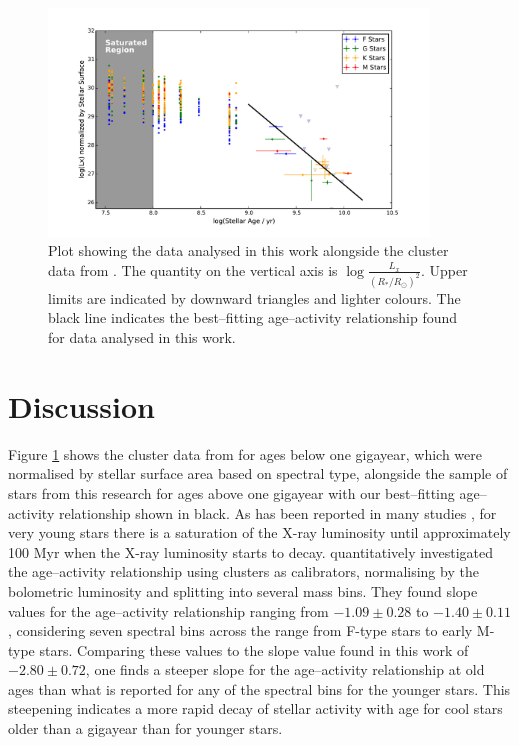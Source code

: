 \begin{figure}[t]
    \centering
    \includegraphics[width=0.9\textwidth]{Figures/3-Xray_age/full_xray_results.pdf}
    \caption[Plot of X-ray sample with best-fitting relationship and cluster data for reference]{Plot showing the data analysed in this work alongside the cluster data from \citet{Jackson_etal_2012}. The quantity on the vertical axis is $\log\frac{L_{x}}{(R_\ast/R_\odot)^{2}}$. Upper limits are indicated by downward triangles and lighter colours. The black line indicates the best--fitting age--activity relationship found for data analysed in this work.}
    \label{fig:full_xray_plot_with_clusters}
\end{figure}

\section{Discussion}
Figure \ref{fig:full_xray_plot_with_clusters} shows the cluster data from \citet{Jackson_etal_2012} for ages below one gigayear, which were normalised by stellar surface area based on spectral type, alongside the sample of stars from this research for ages above one gigayear with our best--fitting age--activity relationship shown in black. As has been reported in many studies \citep{Vilhu_1984,Jardine_Unruh_1999,Pizzolato_etal_2003}, for very young stars there is a saturation of the X-ray luminosity until approximately 100 Myr when the X-ray luminosity starts to decay. \citet{Jackson_etal_2012} quantitatively investigated the age--activity relationship using clusters as calibrators, normalising by the bolometric luminosity and splitting into several mass bins. They found slope values for the age--activity relationship ranging from $-1.09 \pm 0.28$ to $-1.40 \pm 0.11$, considering seven spectral bins across the range from F-type stars to early M-type stars. Comparing these values to the slope value found in this work of $-2.80 \pm 0.72$, one finds a steeper slope for the age--activity relationship at old ages than what is reported for any of the spectral bins for the younger stars. This steepening indicates a more rapid decay of stellar activity with age for cool stars older than a gigayear than for younger stars.

